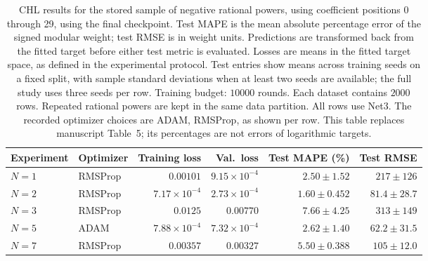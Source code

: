 \begin{table}[!htbp]
\centering
\small
\setlength{\tabcolsep}{4pt}
\renewcommand{\arraystretch}{1.18}
\begin{tabular}{@{}llrrrr@{}}
\toprule
Experiment & Optimizer & Training loss & Val.\ loss & Test MAPE (\%) & Test RMSE \\
\midrule
$N=1$ & RMSProp & $0.00101$ & $9.15\times10^{-4}$ & $2.50\pm1.52$ & $217\pm126$ \\
$N=2$ & RMSProp & $7.17\times10^{-4}$ & $2.73\times10^{-4}$ & $1.60\pm0.452$ & $81.4\pm28.7$ \\
$N=3$ & RMSProp & $0.0125$ & $0.00770$ & $7.66\pm4.25$ & $313\pm149$ \\
$N=5$ & ADAM & $7.88\times10^{-4}$ & $7.32\times10^{-4}$ & $2.62\pm1.40$ & $62.2\pm31.5$ \\
$N=7$ & RMSProp & $0.00357$ & $0.00327$ & $5.50\pm0.388$ & $105\pm12.0$ \\
\bottomrule
\end{tabular}
\caption{\textsf{CHL results for the stored sample of negative rational powers, using coefficient positions 0 through 29, using the final checkpoint. Test MAPE is the mean absolute percentage error of the signed modular weight; test RMSE is in weight units. Predictions are transformed back from the fitted target before either test metric is evaluated. Losses are means in the fitted target space, as defined in the experimental protocol. Test entries show means across training seeds on a fixed split, with sample standard deviations when at least two seeds are available; the full study uses three seeds per row. Training budget: $10000$ rounds. Each dataset contains $2000$ rows. Repeated rational powers are kept in the same data partition. All rows use Net3. The recorded optimizer choices are ADAM, RMSProp, as shown per row. This table replaces manuscript Table~5; its percentages are not errors of logarithmic targets.}}
\label{tab:chl-revised-5-final}
\end{table}
